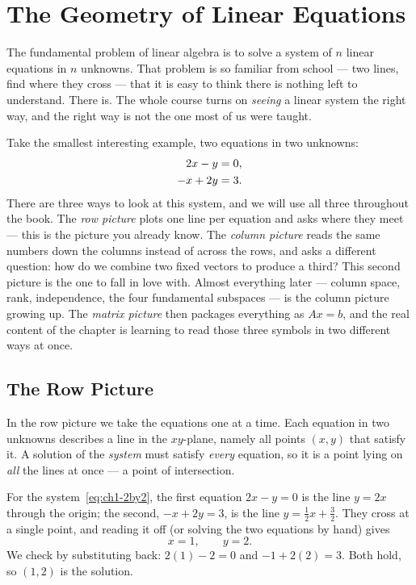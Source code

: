 \chapter{The Geometry of Linear Equations}
\label{ch:1}

The fundamental problem of linear algebra is to solve a system of $n$ linear equations in $n$ unknowns. That problem is so familiar from school --- two lines, find where they cross --- that it is easy to think there is nothing left to understand. There is. The whole course turns on \emph{seeing} a linear system the right way, and the right way is not the one most of us were taught.

Take the smallest interesting example, two equations in two unknowns:
\begin{equation}\label{eq:ch1-2by2}
\begin{aligned}
2x - y &= 0, \\
-x + 2y &= 3.
\end{aligned}
\end{equation}
There are three ways to look at this system, and we will use all three throughout the book. The \emph{row picture} plots one line per equation and asks where they meet --- this is the picture you already know. The \emph{column picture} reads the same numbers down the columns instead of across the rows, and asks a different question: how do we combine two fixed vectors to produce a third? This second picture is the one to fall in love with. Almost everything later --- column space, rank, independence, the four fundamental subspaces --- is the column picture growing up. The \emph{matrix picture} then packages everything as $Ax=b$, and the real content of the chapter is learning to read those three symbols in two different ways at once.

\section{The Row Picture}

In the row picture we take the equations one at a time. Each equation in two unknowns describes a line in the $xy$-plane, namely all points $(x,y)$ that satisfy it. A solution of the \emph{system} must satisfy \emph{every} equation, so it is a point lying on \emph{all} the lines at once --- a point of intersection.

For the system~\eqref{eq:ch1-2by2}, the first equation $2x-y=0$ is the line $y=2x$ through the origin; the second, $-x+2y=3$, is the line $y=\tfrac12 x+\tfrac32$. They cross at a single point, and reading it off (or solving the two equations by hand) gives
\[
x=1,\qquad y=2.
\]
We check by substituting back: $2(1)-2=0$ and $-1+2(2)=3$. Both hold, so $(1,2)$ is the solution.

